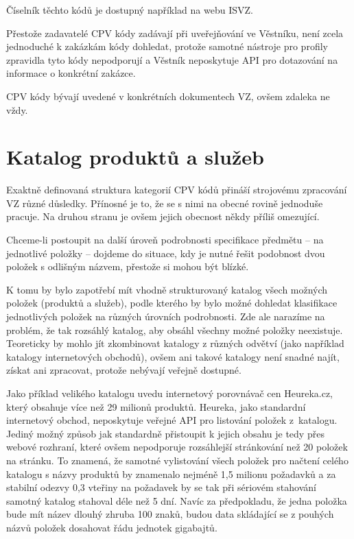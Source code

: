 \documentclass[thesis=M,czech]{FITthesis}[2019/12/23]
\begin{document}
Číselník těchto kódů je dostupný například na webu ISVZ\cite{isvz}.

Přestože zadavatelé CPV kódy zadávají při uveřejňování ve Věstníku, není zcela jednoduché k zakázkám kódy dohledat, protože samotné nástroje pro profily zpravidla tyto kódy nepodporují a Věstník neposkytuje API pro dotazování na informace o konkrétní zakázce.

CPV kódy bývají uvedené v konkrétních dokumentech VZ, ovšem zdaleka ne vždy.

\section{Katalog produktů a služeb}
\label{sec:product_catalog}

Exaktně definovaná struktura kategorií CPV kódů přináší strojovému zpracování VZ různé důsledky. Přínosné je to, že se s nimi na obecné rovině jednoduše pracuje. Na druhou stranu je ovšem jejich obecnost někdy příliš omezující.

Chceme-li postoupit na další úroveň podrobnosti specifikace předmětu -- na jednotlivé položky -- dojdeme do situace, kdy je nutné řešit podobnost dvou položek s odlišným názvem, přestože si mohou být blízké.

K tomu by bylo zapotřebí mít vhodně strukturovaný katalog všech možných položek (produktů a služeb), podle kterého by bylo možné dohledat klasifikace jednotlivých položek na různých úrovních podrobnosti. Zde ale narazíme na problém, že tak rozsáhlý katalog, aby obsáhl všechny možné položky neexistuje. Teoreticky by mohlo jít zkombinovat katalogy z různých odvětví (jako například katalogy internetových obchodů), ovšem ani takové katalogy není snadné najít, získat ani zpracovat, protože nebývají veřejně dostupné.

Jako příklad velikého katalogu uvedu internetový porovnávač cen Heureka.cz, který obsahuje více než 29 milionů produktů\cite{heureka}. Heureka, jako standardní internetový obchod, neposkytuje veřejné API pro listování položek z~katalogu. Jediný možný způsob jak standardně přistoupit k jejich obsahu je tedy přes webové rozhraní, které ovšem nepodporuje rozsáhlejší stránkování než 20 položek na stránku. To znamená, že samotné vylistování všech položek pro načtení celého katalogu s názvy produktů by znamenalo nejméně 1,5 milionu požadavků a za stabilní odezvy 0,3 vteřiny na požadavek by se tak při sériovém stahování samotný katalog stahoval déle než 5 dní. Navíc za předpokladu, že jedna položka bude mít název dlouhý zhruba 100 znaků, budou data skládající se z pouhých názvů položek dosahovat řádu jednotek gigabajtů.
\end{document}
